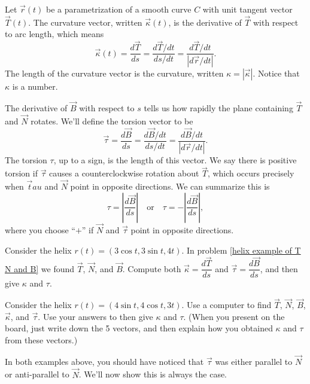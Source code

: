 \begin{definition}
 Let $\vec r(t)$ be a parametrization of a smooth curve $C$ with unit tangent vector $\vec T(t)$.  The curvature vector, written $\vec \kappa(t)$, is the derivative of $\vec T$ with respect to arc length, which means 
 $$\vec \kappa(t)=\dfrac{d\vec T}{ds}=\dfrac{d\vec T/dt}{ds/dt}=\dfrac{d\vec T/dt}{|d\vec r/dt|}.$$ 
 The length of the curvature vector is the curvature, written $\kappa = |\vec\kappa|$. Notice that $\kappa$ is a number.

 The derivative of $\vec B$ with respect to $s$ tells us how rapidly the plane containing $\vec T$ and $\vec N$ rotates. We'll define the torsion vector to be 
%
 $$\vec \tau = \dfrac{d\vec B}{ds} = \dfrac{d\vec B/dt}{ds/dt}=\dfrac{d\vec B/dt}{|d\vec r/dt|}.$$ 
 The torsion $\tau$, up to a sign, is the length of this vector. We say there is positive torsion if $\vec \tau$ causes a counterclockwise rotation about $\vec T$, which occurs precisely when $\vec tau$ and $\vec N$ point in opposite directions. We can summarize this is $$\tau=\left|\dfrac{d\vec B}{ds}\right|\quad \text{or}\quad \tau=-\left|\dfrac{d\vec B}{ds}\right|,$$ where you choose ``$+$'' if $\vec N$ and $\vec \tau$ point in opposite directions. 
\end{definition}


\begin{problem}
%
Consider the helix $r(t)=(3\cos t, 3\sin t, 4t)$. In problem \ref{helix example of T N and B} we found $\vec T$, $\vec N$, and $\vec B$. Compute both $\vec \kappa=\dfrac{d\vec T}{ds}$ and $\vec \tau=\dfrac{d\vec B}{ds}$, and then give $\kappa$ and $\tau$.
\end{problem}

\begin{problem}
 Consider the helix $r(t)=(4\sin t, 4\cos t, 3t)$. Use a computer to find $\vec T$, $\vec N$, $\vec B$, $\vec \kappa$, and $\vec \tau$. Use your answers to then give $\kappa$ and $\tau$. (When you present on the board, just write down the 5 vectors, and then explain how you obtained $\kappa$ and $\tau$ from these vectors.)
\end{problem}

In both examples above, you should have noticed that $\vec \tau$ was either parallel to $\vec N$ or anti-parallel to $\vec N$.  We'll now show this is always the case.

